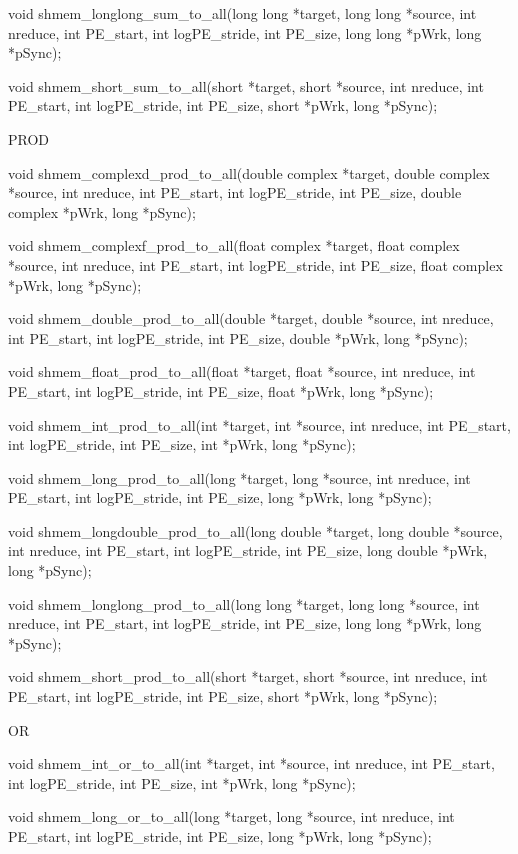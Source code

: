 	  void shmem_longlong_sum_to_all(long long *target, long long *source,
	  int nreduce, int PE_start, int logPE_stride, int PE_size, long  long
	  *pWrk, long *pSync);

	  void	 shmem_short_sum_to_all(short	*target,  short	 *source,  int
	  nreduce, int PE_start, int logPE_stride, int PE_size,	 short	*pWrk,
	  long *pSync);
	  
	  PROD
	  
	  void	 shmem_complexd_prod_to_all(double   complex  *target,	double
	  complex *source, int nreduce, int PE_start,  int  logPE_stride,  int
	  PE_size, double complex *pWrk, long *pSync);

	  void shmem_complexf_prod_to_all(float complex *target, float complex
	  *source, int nreduce, int PE_start, int logPE_stride,	 int  PE_size,
	  float complex *pWrk, long *pSync);

	  void	shmem_double_prod_to_all(double	 *target,  double *source, int
	  nreduce, int PE_start, int logPE_stride, int PE_size, double	*pWrk,
	  long *pSync);

	  void	 shmem_float_prod_to_all(float	*target,  float	 *source,  int
	  nreduce, int PE_start, int logPE_stride, int PE_size,	 float	*pWrk,
	  long *pSync);

	  void	shmem_int_prod_to_all(int  *target,  int *source, int nreduce,
	  int  PE_start,  int  logPE_stride,  int  PE_size,  int  *pWrk,  long
	  *pSync);

	  void shmem_long_prod_to_all(long *target, long *source, int nreduce,
	  int PE_start,	 int  logPE_stride,  int  PE_size,  long  *pWrk,  long
	  *pSync);

	  void	shmem_longdouble_prod_to_all(long  double *target, long double
	  *source, int nreduce, int PE_start, int logPE_stride,	 int  PE_size,
	  long double *pWrk, long *pSync);

	  void	 shmem_longlong_prod_to_all(long   long	  *target,  long  long
	  *source, int nreduce, int PE_start, int logPE_stride,	 int  PE_size,
	  long long *pWrk, long *pSync);

	  void	 shmem_short_prod_to_all(short	*target,  short	 *source,  int
	  nreduce, int PE_start, int logPE_stride, int PE_size,	 short	*pWrk,
	  long *pSync);
	  
	  OR
	  
	  void shmem_int_or_to_all(int *target, int *source, int nreduce,  int
	  PE_start, int logPE_stride, int PE_size, int *pWrk, long *pSync);

	  void	shmem_long_or_to_all(long  *target, long *source, int nreduce,
	  int PE_start,	 int  logPE_stride,  int  PE_size,  long  *pWrk,  long
	  *pSync);

